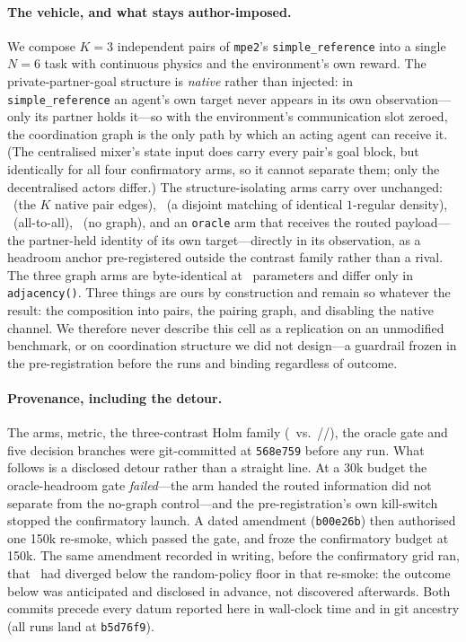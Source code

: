 \paragraph{The vehicle, and what stays author-imposed.} We compose $K{=}3$
independent pairs of \texttt{mpe2}'s \texttt{simple\_reference} into a single
$N{=}6$ task with continuous physics and the environment's own reward. The
private-partner-goal structure is \emph{native} rather than injected: in
\texttt{simple\_reference} an agent's own target never appears in its own
observation---only its partner holds it---so with the environment's
communication slot zeroed, the coordination graph is the only path by which an
acting agent can receive it. (The centralised mixer's state input does carry
every pair's goal block, but identically for all four confirmatory arms, so it
cannot separate them; only the decentralised actors differ.) The
structure-isolating arms carry over unchanged: \gtrue\ (the $K$ native pair
edges), \gwrong\ (a disjoint matching of identical $1$-regular density),
\gcomplete\ (all-to-all), \mlpc\ (no graph), and an \texttt{oracle} arm that
receives the routed payload---the partner-held identity of its own
target---directly in its observation, as a headroom anchor pre-registered
outside the contrast family rather than a rival. The three graph arms are byte-identical at
\PDparams\ parameters and differ only in \texttt{adjacency()}. Three things are
ours by construction and remain so whatever the result: the composition into
pairs, the pairing graph, and disabling the native channel. We therefore never
describe this cell as a replication on an unmodified benchmark, or on
coordination structure we did not design---a guardrail frozen in the
pre-registration before the runs and binding regardless of outcome.

\paragraph{Provenance, including the detour.} The arms, metric, the
three-contrast Holm family (\gtrue\ vs.\ \gwrong/\gcomplete/\mlpc), the oracle
gate and five decision branches were git-committed at \texttt{568e759} before
any run. What follows is a disclosed detour rather than a straight line. At a
30k budget the oracle-headroom gate \emph{failed}---the arm handed the routed
information did not separate from the no-graph control---and the
pre-registration's own kill-switch stopped the confirmatory launch. A dated
amendment (\texttt{b00e26b}) then authorised one 150k re-smoke, which passed
the gate, and froze the confirmatory budget at 150k. The same amendment
recorded in writing, before the confirmatory grid ran, that \gtrue\ had
diverged below the random-policy floor in that re-smoke: the outcome below was
anticipated and disclosed in advance, not discovered afterwards. Both commits
precede every datum reported here in wall-clock time and in git ancestry (all
runs land at \texttt{b5d76f9}).

